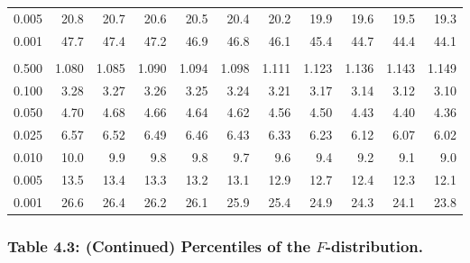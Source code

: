 \documentclass[
]{article}
\begin{document}
\begin{longtable}[t]{lrrrrrrrrrr}
\hspace{1em}0.005 & 20.8 & 20.7 & 20.6 & 20.5 & 20.4 & 20.2 & 19.9 & 19.6 & 19.5 & 19.3\\
\hspace{1em}0.001 & 47.7 & 47.4 & 47.2 & 46.9 & 46.8 & 46.1 & 45.4 & 44.7 & 44.4 & 44.1\\
\addlinespace[0.3em]
\multicolumn{11}{l}{\textbf{$k_2=5$}}\\
\hspace{1em}0.500 & 1.080 & 1.085 & 1.090 & 1.094 & 1.098 & 1.111 & 1.123 & 1.136 & 1.143 & 1.149\\
\hspace{1em}0.100 & 3.28 & 3.27 & 3.26 & 3.25 & 3.24 & 3.21 & 3.17 & 3.14 & 3.12 & 3.10\\
\hspace{1em}0.050 & 4.70 & 4.68 & 4.66 & 4.64 & 4.62 & 4.56 & 4.50 & 4.43 & 4.40 & 4.36\\
\hspace{1em}0.025 & 6.57 & 6.52 & 6.49 & 6.46 & 6.43 & 6.33 & 6.23 & 6.12 & 6.07 & 6.02\\
\hspace{1em}0.010 & 10.0 & 9.9 & 9.8 & 9.8 & 9.7 & 9.6 & 9.4 & 9.2 & 9.1 & 9.0\\
\hspace{1em}0.005 & 13.5 & 13.4 & 13.3 & 13.2 & 13.1 & 12.9 & 12.7 & 12.4 & 12.3 & 12.1\\
\hspace{1em}0.001 & 26.6 & 26.4 & 26.2 & 26.1 & 25.9 & 25.4 & 24.9 & 24.3 & 24.1 & 23.8\\
\bottomrule
\end{longtable}

\newpage

\subsubsection{\texorpdfstring{Table 4.3: (Continued) Percentiles of the
\(F\)-distribution.}{Table 4.3: (Continued) Percentiles of the F-distribution.}}\label{table-4.3-continued-percentiles-of-the-f-distribution.}
\end{document}
